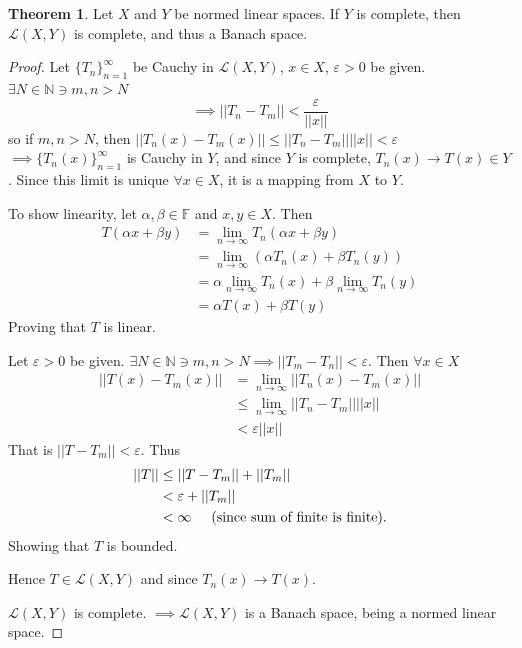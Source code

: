 \documentclass[11pt,a4paper]{article}
\theoremstyle{definition}
\newtheorem{thm}{Theorem}[section]
\begin{document}
\begin{thm}
Let $X$ and $Y$ be normed linear spaces. If $Y$ is complete, then $\mathcal{L}(X,Y)$ is complete, and thus a Banach space.

\end{thm}

\begin{proof}
Let $\{T_n\}^{\infty}_{n=1}$ be Cauchy in $\mathcal{L}(X,Y)$, $x\in X$, $\varepsilon >0$ be given. $\exists N\in \mathbb{N}\ni m,n>N$ $$\implies ||T_n-T_m||<\frac{\varepsilon}{||x||}$$ so if $m,n>N$, then \hspace{0.3cm}$||T_n(x)-T_m(x)||\leq ||T_n-T_m||||x||<\varepsilon$\\
$\implies \{T_n(x)\}^{\infty}_{n=1}$ is Cauchy in $Y$, and since $Y$ is complete, $T_n(x)\rightarrow T(x)\in Y$. Since this limit is unique $\forall x\in X$, it is a mapping from $X$ to $Y$.


To show linearity, let $\alpha, \beta \in \mathbb{F}$ and $x,y\in X$. Then
\begin{align*}
T(\alpha x+\beta y) &=\lim_{n\rightarrow \infty}T_n(\alpha x+\beta y)\\
                    &=\lim_{n\rightarrow \infty}(\alpha T_n(x)+\beta T_n(y))\\
                    &=\alpha \lim_{n\rightarrow \infty}T_n(x)+\beta \lim_{n\rightarrow \infty}T_n(y)\\
                    &=\alpha T(x)+\beta T(y)
\end{align*}
Proving that $T$ is linear.

Let $\varepsilon >0$ be given. $\exists N\in \mathbb{N}\ni m,n>N\implies ||T_m-T_n||<\varepsilon$. Then $\forall x\in X$
\begin{align*}
||T(x)-T_m(x)|| &=\lim_{n\rightarrow \infty}||T_n(x)-T_m(x)||\\
                &\leq \lim_{n\rightarrow \infty}||T_n-T_m||||x||\\
                &<\varepsilon ||x||
\end{align*}
That is $||T-T_m||<\varepsilon$. Thus
\begin{align*}
||T|| &\leq ||T-T_m||+||T_m||\\
      &<\varepsilon +||T_m||\\
      &<\infty \hspace{0.5cm} \text{(since sum of finite is finite)}. 
\end{align*}
Showing that $T$ is bounded.

Hence $T\in \mathcal{L}(X,Y)$ and since $T_n(x)\rightarrow T(x)$.

$\mathcal{L}(X,Y)$ is complete. $\implies \mathcal{L}(X,Y)$ is a Banach space, being a normed linear space.
\end{proof}
\end{document}
